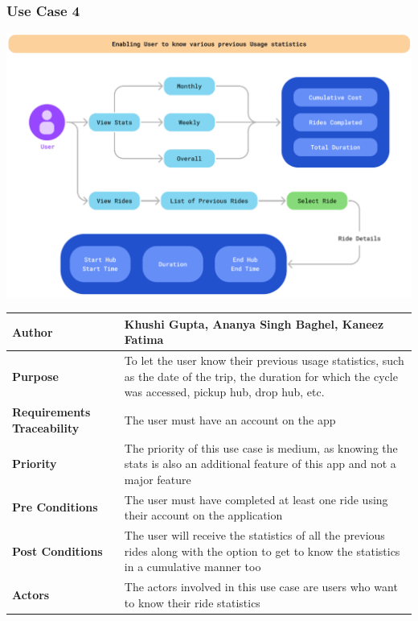 \documentclass[11pt]{article}
\begin{document}
\subsubsection{Use Case 4}
\begin{center}
\includegraphics*[scale=0.6]{usecase-4.png}\\
\vspace{5mm}
\begin{tabular}{|l|p{10cm}|}
    \hline
    \textbf{Author} & Khushi Gupta, Ananya Singh Baghel, Kaneez Fatima\\
    \hline
    \textbf{Purpose} &  To let the user know their previous usage statistics, such as the date of the trip, the duration for which the cycle was accessed, pickup hub, drop hub, etc.\\
    \hline
    \textbf{Requirements Traceability} & The user must have an account on the app\\
    \hline
    \textbf{Priority} &The priority of this use case is medium, as knowing the stats is also an additional feature of this app and not a major feature \\
    \hline
    \textbf{Pre Conditions} & The user must have completed at least one ride using their account on the application\\
    \hline
    \textbf{Post Conditions} & The user will receive the statistics of all the previous rides along with the option to get to know the statistics in a cumulative manner too\\
    \hline
    \textbf{Actors} &The actors involved in this use case are users who want to know their ride statistics \\
    \hline
\end{tabular}
\end{center}
\end{document}
